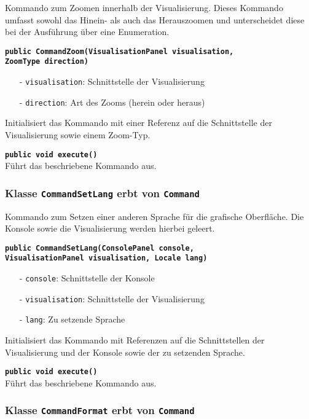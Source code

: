\documentclass[parskip=full,11pt,twoside]{scrartcl}
\begin{document}
Kommando zum Zoomen innerhalb der Visualisierung. Dieses Kommando umfasst sowohl das Hinein- als auch das Herauszoomen und unterscheidet diese bei der Ausführung über eine Enumeration.

\textbf{\texttt{public CommandZoom(VisualisationPanel visualisation,\\ZoomType direction)}}
\begin{itemize}[noitemsep]
	\item[-] \texttt{visualisation}: Schnittstelle der Visualisierung
	\item[-] \texttt{direction}: Art des Zooms (herein oder heraus)
\end{itemize}
Initialisiert das Kommando mit einer Referenz auf die Schnittstelle der Visualisierung sowie einem Zoom-Typ.

\textbf{\texttt{public void execute()}}\\
Führt das beschriebene Kommando aus.

\subsubsection{Klasse \texttt{CommandSetLang} erbt von \texttt{Command}}

Kommando zum Setzen einer anderen Sprache für die grafische Oberfläche. Die Konsole sowie die Visualisierung werden hierbei geleert.

\textbf{\texttt{public CommandSetLang(ConsolePanel console,\\VisualisationPanel visualisation, Locale lang)}}
\begin{itemize}[noitemsep]
	\item[-] \texttt{console}: Schnittstelle der Konsole
	\item[-] \texttt{visualisation}: Schnittstelle der Visualisierung
	\item[-] \texttt{lang}: Zu setzende Sprache
\end{itemize}
Initialisiert das Kommando mit Referenzen auf die Schnittstellen der Visualisierung und der Konsole sowie der zu setzenden Sprache.

\textbf{\texttt{public void execute()}}\\
Führt das beschriebene Kommando aus.

\subsubsection{Klasse \texttt{CommandFormat} erbt von \texttt{Command}}
\end{document}
